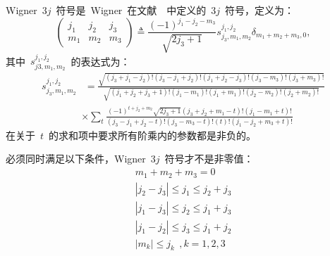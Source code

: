 Wigner~$3j$~符号是~Wigner~在文献~\cite{Wigner_3j}~中定义的~$3j$~符号，定义为：
\begin{equation}
\left(\begin{array}{ccc}
j_{1} & j_{2} & j_{3} \\
m_{1} & m_{2} & m_{3}
\end{array}\right) \triangleq \frac{(-1)^{j_{1}-j_{2}-m_{3}}}{\sqrt{2 j_{3}+1}} s_{j_{3}, m_{1}, m_{2}}^{j_{1}, j_{2}} \delta_{m_{1}+m_{2}+m_{3}, 0} ,
\end{equation}
其中~$s_{j 3, m_{1}, m_{2}}^{j_{1}, j_{2}}$~的表达式为：
\begin{align*}
s_{j_{3}, m_{1}, m_{2}}^{j_{1}, j_{2}} &=
\frac{\sqrt{\left(j_{3}+j_{1}-j_{2}\right) !\left(j_{3}-j_{1}+j_{2}\right) !\left(j_{1}+j_{2}-j_{3}\right) !\left(j_{3}-m_{3}\right) !\left(j_{3}+m_{3}\right) !}}{\sqrt{\left(j_{1}+j_{2}+j_{3}+1\right) !\left(j_{1}-m_{1}\right) !\left(j_{1}+m_{1}\right) !\left(j_{2}-m_{2}\right) !\left(j_{2}+m_{2}\right) !}}
\end{align*}
\begin{align*}
&  \times \sum_{t} \frac{(-1)^{t+j_{2}+m_{2}} \sqrt{2 j_{3}+1}\left(j_{3}+j_{2}+m_{1}-t\right) !\left(j_{1}-m_{1}+t\right) !}{\left(j_{3}-j_{1}+j_{2}-t\right) !\left(j_{3}-m_{3}-t\right) !(t) !\left(j_{1}-j_{2}+m_{3}+t\right) !}
\end{align*}
在关于~$t$~的求和项中要求所有阶乘内的参数都是非负的。

必须同时满足以下条件，Wigner~$3j$~符号才不是非零值：
\begin{equation}\label{eigner_if}
\begin{split}
m_{1}+m_{2}+m_{3}  = 0 \\
|j_{2}-j_{3}|  \leq j_{1}  \leq j_{2}+j_{3} \\
|j_{1}-j_{3}|  \leq j_{2}  \leq j_{1}+j_{3} \\
|j_{1}-j_{2}|  \leq j_{3}  \leq j_{1}+j_{2} \\
|m_{k}| \leq j_{k}~~,k = 1,2,3
\end{split}
\end{equation}

